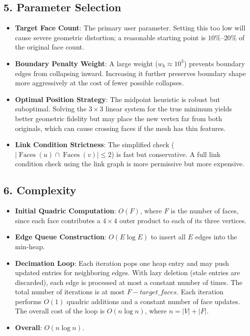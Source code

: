 \subsection{5. Parameter Selection}

\begin{itemize}
    \item \textbf{Target Face Count}: The primary user parameter. Setting this too low will cause severe geometric distortion; a reasonable starting point is $10\%$--$20\%$ of the original face count.
    \item \textbf{Boundary Penalty Weight}: A large weight ($w_b \approx 10^3$) prevents boundary edges from collapsing inward. Increasing it further preserves boundary shape more aggressively at the cost of fewer possible collapses.
    \item \textbf{Optimal Position Strategy}: The midpoint heuristic is robust but suboptimal. Solving the $3 \times 3$ linear system for the true minimum yields better geometric fidelity but may place the new vertex far from both originals, which can cause crossing faces if the mesh has thin features.
    \item \textbf{Link Condition Strictness}: The simplified check ($|\operatorname{Faces}(u) \cap \operatorname{Faces}(v)| \leq 2$) is fast but conservative. A full link condition check using the link graph is more permissive but more expensive.
\end{itemize}

\subsection{6. Complexity}

\begin{itemize}
    \item \textbf{Initial Quadric Computation}: $O(F)$, where $F$ is the number of faces, since each face contributes a $4 \times 4$ outer product to each of its three vertices.
    \item \textbf{Edge Queue Construction}: $O(E \log E)$ to insert all $E$ edges into the min-heap.
    \item \textbf{Decimation Loop}: Each iteration pops one heap entry and may push updated entries for neighboring edges. With lazy deletion (stale entries are discarded), each edge is processed at most a constant number of times. The total number of iterations is at most $F - target\_faces$. Each iteration performs $O(1)$ quadric additions and a constant number of face updates. The overall cost of the loop is $O(n \log n)$, where $n = |V| + |F|$.
    \item \textbf{Overall}: $O(n \log n)$.
\end{itemize}

